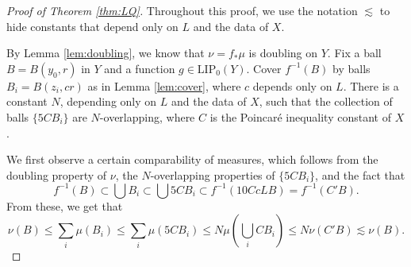 \documentclass{amsart}
\theoremstyle{plain}
\theoremstyle{definition}
\numberwithin{equation}{section}
\numberwithin{theorem}{section}
\begin{document}
\begin{proof}[Proof of Theorem \ref{thm:LQ}]
Throughout this proof, we use the notation $\lesssim$ to hide constants that depend only on $L$ and the data of $X$.

By Lemma \ref{lem:doubling}, we know that $\nu=f_*\mu$ is doubling on $Y$. Fix a ball $B=B(y_0,r)$ in $Y$ and a function $g\in \text{LIP}_0(Y)$. Cover $f^{-1}(B)$ by balls $B_i=B(z_i,cr)$ as in Lemma \ref{lem:cover}, where $c$ depends only on $L$. There is a constant $N$, depending only on $L$ and the data of $X$, such that the collection of balls $\{5CB_i\}$ are $N$-overlapping, where $C$ is the Poincar\'e inequality constant of $X$.

We first observe a certain comparability of measures, which follows from the doubling property of $\nu$, the $N$-overlapping properties of $\{5CB_i\}$, and the fact that $$f^{-1}(B) \subset \bigcup B_i \subset \bigcup 5CB_i \subset f^{-1}(10CcLB) = f^{-1}(C'B).$$
From these, we get that
\begin{equation}\label{eq:measurebounds}
\nu(B) \leq \sum_i \mu(B_i) \leq \sum_i \mu(5CB_i) \leq N \mu\left(\bigcup_i CB_i\right) \leq N\nu(C'B) \lesssim \nu(B).
\end{equation}



\end{proof}
\end{document}
